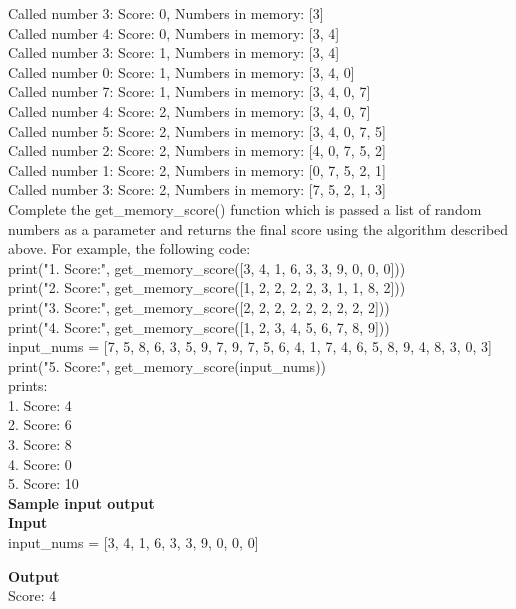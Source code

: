 \documentclass[12pt,  letterpaper,  twoside]{article}
\begin{document}
	\noindent Called number 3: Score: 0, Numbers in memory: [3]\\
	Called number 4: Score: 0, Numbers in memory: [3, 4]\\
	Called number 3: Score: 1, Numbers in memory: [3, 4]\\
	Called number 0: Score: 1, Numbers in memory: [3, 4, 0]\\
	Called number 7: Score: 1, Numbers in memory: [3, 4, 0, 7]\\
	Called number 4: Score: 2, Numbers in memory: [3, 4, 0, 7]\\
	Called number 5: Score: 2, Numbers in memory: [3, 4, 0, 7, 5]\\
	Called number 2: Score: 2, Numbers in memory: [4, 0, 7, 5, 2]\\
	Called number 1: Score: 2, Numbers in memory: [0, 7, 5, 2, 1]\\
	Called number 3: Score: 2, Numbers in memory: [7, 5, 2, 1, 3]\\
	
	Complete the get\_memory\_score() function which is passed a list of random 
	numbers as a parameter and returns the final score using the algorithm 
	described above. For example, the following code:\\
	print("1. Score:", get\_memory\_score([3, 4, 1, 6, 3, 3, 9, 0, 0, 0]))\\
	print("2. Score:", get\_memory\_score([1, 2, 2, 2, 2, 3, 1, 1, 8, 2]))\\
	print("3. Score:", get\_memory\_score([2, 2, 2, 2, 2, 2, 2, 2, 2]))\\
	print("4. Score:", get\_memory\_score([1, 2, 3, 4, 5, 6, 7, 8, 9]))\\
	input\_nums = [7, 5, 8, 6, 3, 5, 9, 7, 9, 7, 5, 6, 4, 1, 7, 4, 6, 5, 8, 
	9, 
	4, 8, 3, 0, 3]\\
	print("5. Score:", get\_memory\_score(input\_nums))\\
	
	prints:\\
	1. Score: 4\\
	2. Score: 6\\
	3. Score: 8\\
	4. Score: 0\\
	5. Score: 10\\
	
	\textbf{Sample input output }\\
	
	\textbf{Input}\\
	\noindent	input\_nums = [3, 4, 1, 6, 3, 3, 9, 0, 0, 0]
	
	\textbf{Output}\\
	\noindent	
	Score: 4 \\ 
	
	
\end{document}
